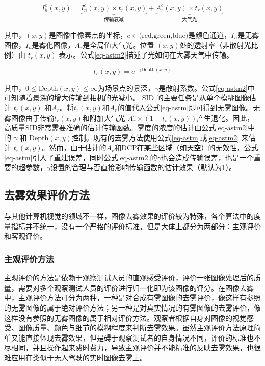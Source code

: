 \begin{equation}
    I_h^c(x,y) = \underbrace{I_n^c(x,y)\times t_r(x,y)}_{\text{传输衰减}} + \underbrace{A_r^c(x,y)\times t_r(x,y)}_{\text{大气光}}
    \label{eq-astm}
\end{equation}

其中，$(x,y)$是图像中像素点的坐标，$c\in\text{(red,green,blue)}$是颜色通道，$I_n$是无雾图像，$I_h$是雾化图像，$A_r$是全局值大气光。位置 $(x,y)$处的透射率（非散射光比例）由 $t_r (x, y)$ 表示。公式\eqref{eq-astm2}描述了光如何在大雾天气中传输。

\begin{equation}
    t_r (x, y) = e^{-\gamma\text{Depth}(x, y)}
    \label{eq-astm2}
\end{equation}

其中，$0\leq\text{Depth}(x, y)\leq\infty$为场景点的景深，$\gamma$是散射系数。公式\eqref{eq-astm2}中可知随着景深的增大传输到相机的光减小。 SID 的主要任务是从单个模糊图像\cite{he.tang201112}估计 $t_r (x, y)$ 和$A_r$。将$t_r (x, y)$和$A_r$的值代入公式\eqref{eq-astm}即可得到无雾图像。无雾图像由于传输$t_r (x, y)$和附加大气光 $A^c_r\times (1 − t_r (x, y))$产生退化。因此，高质量SID非常需要准确的估计传输函数。雾度的浓度的估计由公式\eqref{eq-astm2}中的 $\gamma$ 和 Depth$(x,y)$控制。现有的去雾方法使用公式\eqref{eq-astm}或\eqref{eq-astm2} 来估计 $t_r (x, y)$。然而，由于估计的$A_r$和DCP在某些区域（如天空）的无效性，公式\eqref{eq-astm}引入了重建误差，同时公式\eqref{eq-astm2}的$\gamma$也会造成传输误差，也是一个重要的超参数，$\gamma$设置的合理与否直接影响传输函数的估计效果（默认为1）。

\subsection{去雾效果评价方法}
与其他计算机视觉的领域不一样，图像去雾效果的评价较为特殊，各个算法中的度量指标并不统一，没有一个严格的评价标准，但是大体上都分为两部分：主观评价和客观评价。

\subsubsection{主观评价方法}
主观评价的方法是依赖于观察测试人员的直观感受评价，评价一张图像处理后的质量，需要对多个观察测试人员的评价进行归一化即为该图像的评分。在图像去雾中，主观评价方法可分为两种，一种是对合成有雾图像的去雾评价，像这样有参照的无雾图像的属于绝对评价方法；另一种是对真实情况的有雾图像的去雾评价，像这样没有参照的无雾图像的属于相对评价方法。观察者根据自身对图像的视觉感受、图像质量、颜色与细节的模糊程度来判断去雾效果。虽然主观评价方法原理简单又能直接体现去雾效果，但是碍于观察测试者的自身情况不同，评价的标准也不尽相同，并且操作起来费时费力，导致主观评价并不能精准的反映去雾效果，也很难应用在类似于无人驾驶的实时图像去雾上。

